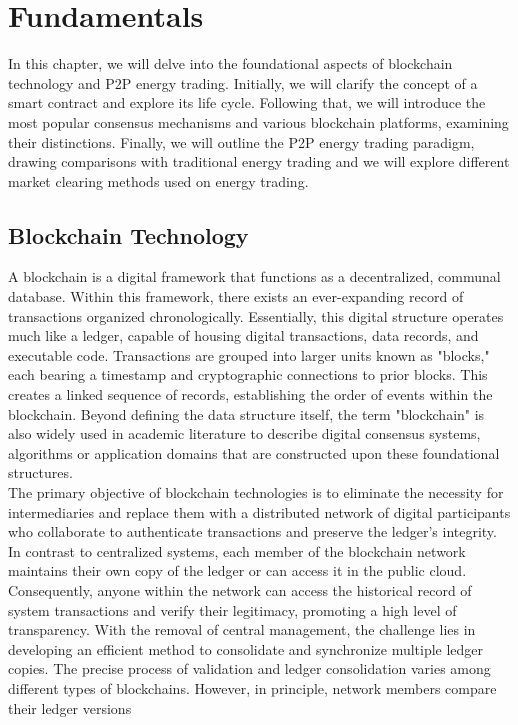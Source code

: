 \chapter{Fundamentals} \label{fandamentals}
In this chapter, we will delve into the foundational aspects of blockchain technology and P2P energy trading.
Initially, we will clarify the concept of a smart contract and explore its life cycle. Following that, we will introduce the most popular consensus mechanisms
and various blockchain platforms, examining their distinctions. Finally, we will outline the P2P energy trading paradigm,
drawing comparisons with traditional energy trading and we will explore different market clearing methods used on energy trading.

\section{Blockchain Technology}
A blockchain is a digital framework that functions as a decentralized, communal database. Within this framework, there exists an ever-expanding record of transactions
organized chronologically. Essentially, this digital structure operates much like a ledger, capable of housing digital transactions, data records, and executable code.
Transactions are grouped into larger units known as "blocks," each bearing a timestamp and cryptographic connections to prior blocks. This creates a linked sequence of records,
establishing the order of events within the blockchain. Beyond defining the data structure itself, the term "blockchain" is also widely used in academic literature to describe digital consensus
systems, algorithms or application domains that are constructed upon these foundational structures.\\
The primary objective of blockchain technologies is to eliminate the necessity for intermediaries and replace them with a distributed network of digital participants who
collaborate to authenticate transactions and preserve the ledger's integrity. In contrast to centralized systems, each member of the blockchain network maintains their own copy
of the ledger or can access it in the public cloud. Consequently, anyone within the network can access the historical record of system transactions and verify their legitimacy,
promoting a high level of transparency. With the removal of central management, the challenge lies in developing an efficient method to consolidate and synchronize multiple ledger
copies. The precise process of validation and ledger consolidation varies among different types of blockchains. However, in principle, network members compare their ledger versions
